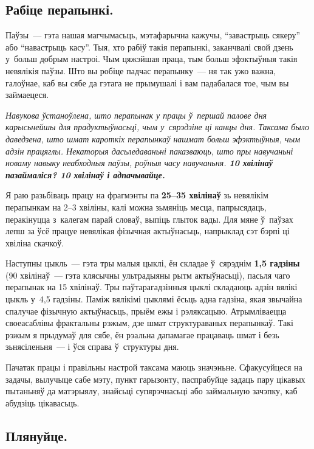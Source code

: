 
\subsection*{Рабіце перапынкі.}

Паўзы~--- гэта нашая магчымасьць, мэтафарычна кажучы, ``завастрыць сякеру'' або ``навастрыць касу''. Тыя, хто рабіў такія перапынкі, заканчвалі свой дзень у~больш добрым настроі. Чым цяжэйшая праца, тым больш эфэктыўныя такія невялікія паўзы. Што вы робіце падчас перапынку~--- ня так ужо важна, галоўнае, каб вы сябе да гэтага не прымушалі і вам падабалася тое, чым вы займаецеся.

\emph{Навукова ўстаноўлена, што перапынак у працы ў~першай палове дня карысьнейшы для прадуктыўнасьці, чым у~сярэдзіне ці канцы дня. Таксама было даведзена, што шмат кароткіх перапынкаў нашмат больш эфэктыўныя, чым адзін працяглы. Некаторыя дасьледаваньні паказваюць, што пры навучаньні новаму навыку неабходныя паўзы, роўныя часу навучаньня. \textbf{10 хвілінаў пазаймаліся? 10 хвілінаў і адпачывайце.}}

Я раю разьбіваць працу на фрагмэнты па \textbf{25--35 хвілінаў} зь невялікім перапынкам на 2--3 хвіліны, калі можна зьмяніць месца, папрысядаць, перакінуцца з~калегам парай словаў, выпіць глыток вады. Для мяне ў~паўзах лепш за ўсё працуе невялікая фізычная актыўнасьць, напрыклад сэт бэрпі ці хвіліна скачкоў. 

Наступны цыкль~--- гэта тры малыя цыклі, ён складае ў~сярэднім \textbf{1,5 гадзіны} (90 хвілінаў~--- гэта клясычны ультрадыяны рытм актыўнасьці), пасьля чаго перапынак на 15 хвілінаў. Тры паўтарагадзінныя цыклі складаюць адзін вялікі цыкль у~4,5 гадзіны. Паміж вялікімі цыклямі ёсьць адна гадзіна, якая звычайна спалучае фізычную актыўнасьць, прыём ежы і рэляксацыю. Атрымліваецца своеасаблівы фрактальны рэжым, дзе шмат структураваных перапынкаў. Такі рэжым я прыдумаў для сябе, ён рэальна дапамагае працаваць шмат і безь зьнясіленьня~--- і ўся справа ў~структуры дня.

Пачатак працы і правільны настрой таксама маюць значэньне. Сфакусуйцеся на задачы, вылучыце сабе мэту, пункт гарызонту, паспрабуйце задаць пару цікавых пытаньняў да матэрыялу, знайсьці супярэчнасьці або займальную зачэпку, каб абудзіць цікавасьць.

\subsection*{Плянуйце.}

